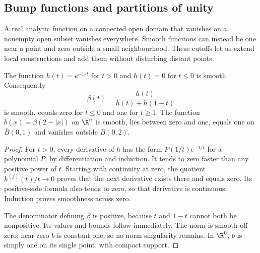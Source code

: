 \subsection*{Bump functions and partitions of unity}

A real analytic function on a connected open domain that vanishes on a nonempty open subset vanishes everywhere. Smooth functions can instead be one near a point and zero outside a small neighbourhood. These cutoffs let us extend local constructions and add them without disturbing distant points.

\begin{lemma}\label{lem:bump}
The function $h(t)=e^{-1/t}$ for $t>0$ and $h(t)=0$ for $t\le0$ is smooth. Consequently
\[
\beta(t)=\frac{h(t)}{h(t)+h(1-t)}
\]
is smooth, equals zero for $t\le0$ and one for $t\ge1$. The function $b(x)=\beta(2-|x|)$ on $\R^n$ is smooth, lies between zero and one, equals one on $\bar B(0,1)$ and vanishes outside $B(0,2)$.
\end{lemma}
\begin{proof}
For $t>0$, every derivative of $h$ has the form $P(1/t)e^{-1/t}$ for a polynomial $P$, by differentiation and induction. It tends to zero faster than any positive power of $t$. Starting with continuity at zero, the quotient $h^{(j)}(t)/t\to0$ proves that the next derivative exists there and equals zero. Its positive-side formula also tends to zero, so that derivative is continuous. Induction proves smoothness across zero.

The denominator defining $\beta$ is positive, because $t$ and $1-t$ cannot both be nonpositive. Its values and bounds follow immediately. The norm is smooth off zero; near zero $b$ is constant one, so no norm singularity remains. In $\R^0$, $b$ is simply one on its single point, with compact support.
\end{proof}

